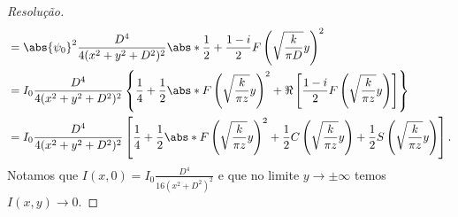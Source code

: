 \begin{proof}[Resolução]
\begin{align*}
               &= \abs{\psi_0}^2 \frac{D^4}{4(x^2 + y^2 + D^2)^2} \abs*{\frac12 + \frac{1 - i}{2} F\left(\sqrt{\frac{k}{\pi D}} y\right)}^2\\
               &= I_0 \frac{D^4}{4(x^2 + y^2 + D^2)^2} \left\{\frac14 + \frac12\abs*{F\left(\sqrt{\frac{k}{\pi z}} y\right)}^2 + \Re\left[\frac{1 - i}{2} F\left(\sqrt{\frac{k}{\pi z}} y\right)\right]\right\}\\
               &= I_0 \frac{D^4}{4(x^2 + y^2 + D^2)^2} \left[\frac14 + \frac12\abs*{F\left(\sqrt{\frac{k}{\pi z}} y\right)}^2 + \frac12 C\left(\sqrt{\frac{k}{\pi z}} y\right) + \frac12 S\left(\sqrt{\frac{k}{\pi z}} y\right)\right].
    \end{align*}
    Notamos que \(I(x,0) = I_0\frac{D^4}{16(x^2 + D^2)^2}\) e que no limite \(y \to \pm\infty\) temos \(I(x,y) \to 0\).
\end{proof}
